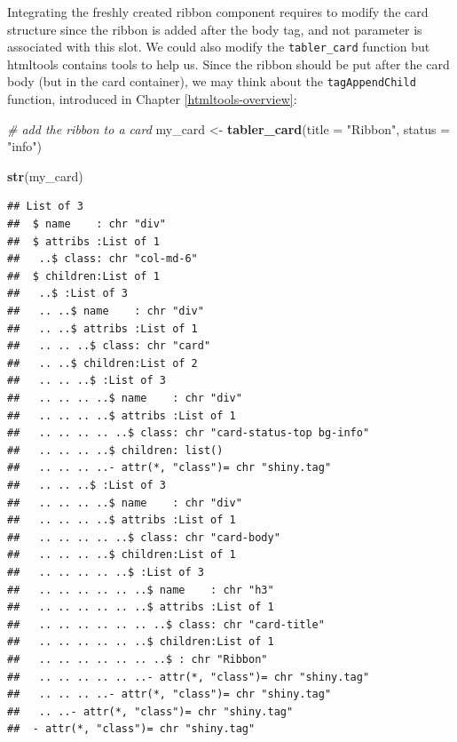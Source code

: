 \documentclass[
]{book}
\newenvironment{Shaded}{\begin{snugshade}}{\end{snugshade}}
\newcommand{\CommentTok}[1]{\textcolor[rgb]{0.56,0.35,0.01}{\textit{#1}}}
\newcommand{\DataTypeTok}[1]{\textcolor[rgb]{0.13,0.29,0.53}{#1}}
\newcommand{\DecValTok}[1]{\textcolor[rgb]{0.00,0.00,0.81}{#1}}
\newcommand{\KeywordTok}[1]{\textcolor[rgb]{0.13,0.29,0.53}{\textbf{#1}}}
\newcommand{\NormalTok}[1]{#1}
\newcommand{\OperatorTok}[1]{\textcolor[rgb]{0.81,0.36,0.00}{\textbf{#1}}}
\newcommand{\OtherTok}[1]{\textcolor[rgb]{0.56,0.35,0.01}{#1}}
\newcommand{\StringTok}[1]{\textcolor[rgb]{0.31,0.60,0.02}{#1}}
\begin{document}
Integrating the freshly created ribbon component requires to modify the card structure since the ribbon is added after the body tag, and not parameter is associated with this slot. We could also modify the \texttt{tabler\_card} function but htmltools contains tools to help us. Since the ribbon should be put after the card body (but in the card container), we may think about the \texttt{tagAppendChild} function, introduced in Chapter \ref{htmltools-overview}:

\begin{Shaded}
\begin{Highlighting}[]
\CommentTok{# add the ribbon to a card}
\NormalTok{my_card <-}\StringTok{ }\KeywordTok{tabler_card}\NormalTok{(}\DataTypeTok{title =} \StringTok{"Ribbon"}\NormalTok{, }\DataTypeTok{status =} \StringTok{"info"}\NormalTok{)}

\KeywordTok{str}\NormalTok{(my_card)}
\end{Highlighting}
\end{Shaded}

\begin{verbatim}
## List of 3
##  $ name    : chr "div"
##  $ attribs :List of 1
##   ..$ class: chr "col-md-6"
##  $ children:List of 1
##   ..$ :List of 3
##   .. ..$ name    : chr "div"
##   .. ..$ attribs :List of 1
##   .. .. ..$ class: chr "card"
##   .. ..$ children:List of 2
##   .. .. ..$ :List of 3
##   .. .. .. ..$ name    : chr "div"
##   .. .. .. ..$ attribs :List of 1
##   .. .. .. .. ..$ class: chr "card-status-top bg-info"
##   .. .. .. ..$ children: list()
##   .. .. .. ..- attr(*, "class")= chr "shiny.tag"
##   .. .. ..$ :List of 3
##   .. .. .. ..$ name    : chr "div"
##   .. .. .. ..$ attribs :List of 1
##   .. .. .. .. ..$ class: chr "card-body"
##   .. .. .. ..$ children:List of 1
##   .. .. .. .. ..$ :List of 3
##   .. .. .. .. .. ..$ name    : chr "h3"
##   .. .. .. .. .. ..$ attribs :List of 1
##   .. .. .. .. .. .. ..$ class: chr "card-title"
##   .. .. .. .. .. ..$ children:List of 1
##   .. .. .. .. .. .. ..$ : chr "Ribbon"
##   .. .. .. .. .. ..- attr(*, "class")= chr "shiny.tag"
##   .. .. .. ..- attr(*, "class")= chr "shiny.tag"
##   .. ..- attr(*, "class")= chr "shiny.tag"
##  - attr(*, "class")= chr "shiny.tag"
\end{verbatim}

\begin{Shaded}
\end{Shaded}
\end{document}
